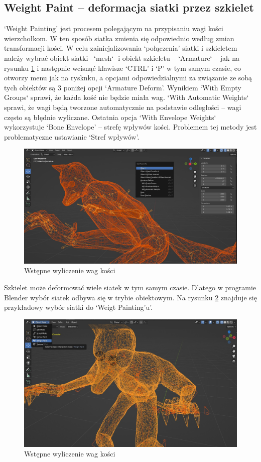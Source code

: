 \documentclass[12pt,twoside]{article}
\begin{document}
\subsection{Weight Paint -- deformacja siatki przez szkielet}
`Weight Painting' jest procesem polegającym na przypisaniu wagi kości
wierzchołkom. W ten sposób siatka zmienia się odpowiednio według zmian
transformacji kości. W celu zainicjalizowania ‘połączenia’ siatki  i szkieletem
należy wybrać obiekt siatki –`mesh`- i obiekt szkieletu -- `Armature` -- jak na
rysunku \ref{Blender:ArmatureDeform} i następnie wcisnąć klawisze ‘CTRL’ i ‘P’ w tym samym czasie, co
otworzy menu jak na rysknku, a opcjami odpowiedzialnymi za związanie ze sobą
tych obiektów są 3 poniżej opcji ‘Armature Deform’. Wynikiem `With Empty Groups`
sprawi, że każda kość nie będzie miała wag. `With Automatic Weights` sprawi, że
wagi będą tworzone automatycznie na podstawie odległości -- wagi często są
błędnie wyliczane. Ostatnia opcja `With Envelope Weights` wykorzystuje ‘Bone
Envelope’ -- strefę wpływów kości. Problemem tej metody jest problematyczne
ustawianie ‘Stref wpływów’. 

\begin{figure}[h]
    \centering
    \includegraphics[width=12cm]{BlenderPict/WeightPaint_ArmatureDeform.jpg}
    \caption{Wstępne wyliczenie wag kości }
    \label{Blender:ArmatureDeform}
\end{figure}

Szkielet może deformować wiele siatek w tym samym czasie. Dlatego w programie
Blender wybór siatek odbywa się w trybie obiektowym. Na rysunku
\ref{Blender:BeginWeightPaint} znajduje się przykładowy wybór siatki do `Weigt
Painting’u'. 
\begin{figure}[h]
    \centering
    \includegraphics[width=12cm]{BlenderPict/WeightPaint_BeginWeightPaint.jpg}
    \caption{Wstępne wyliczenie wag kości }
    \label{Blender:BeginWeightPaint}
\end{figure}
\end{document}
